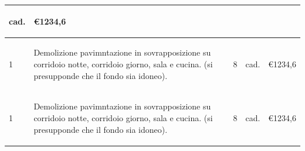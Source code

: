 \documentclass[a4paper]{article}
\begin{document}
\begin{tabular}{ | L{10mm} |  L{86mm} | L{12mm} | L{12mm} | L{16mm} | }
  \begin{spacing}{0}
    cad.
  \end{spacing} &
  \vspace{2.5mm}
  \begin{spacing}{0}
    \euro\hfill 1234,6
  \end{spacing} \\
  \hline
  \vspace{2.5mm}
  \begin{spacing}{0}
    1
  \end{spacing} &
  \vspace{2.5mm}
  \begin{spacing}{0}
  Demolizione pavimntazione in sovrapposizione su corridoio
notte, corridoio giorno, sala e cucina. (si presupponde
che il fondo sia idoneo).
  \end{spacing} &
  \vspace{2.5mm}
  \begin{spacing}{0}
    8
  \end{spacing} &
  \vspace{2.5mm}
  \begin{spacing}{0}
    cad.
  \end{spacing} &
  \vspace{2.5mm}
  \begin{spacing}{0}
    \euro\hfill 1234,6
  \end{spacing} \\
  \hline
  \vspace{2.5mm}
  \begin{spacing}{0}
    1
  \end{spacing} &
  \vspace{2.5mm}
  \begin{spacing}{0}
  Demolizione pavimntazione in sovrapposizione su corridoio
notte, corridoio giorno, sala e cucina. (si presupponde
che il fondo sia idoneo).
  \end{spacing} &
  \vspace{2.5mm}
  \begin{spacing}{0}
    8
  \end{spacing} &
  \vspace{2.5mm}
  \begin{spacing}{0}
    cad.
  \end{spacing} &
  \vspace{2.5mm}
  \begin{spacing}{0}
    \euro\hfill 1234,6
  \end{spacing} \\

\end{tabular}
\end{document}
